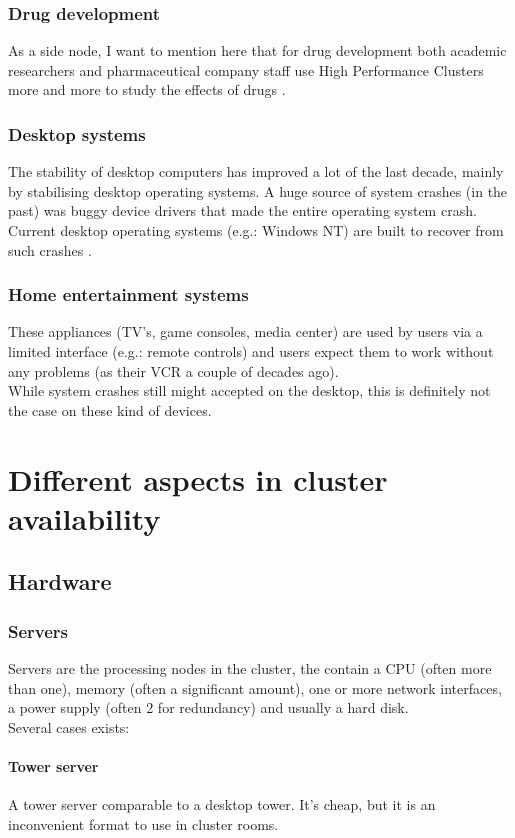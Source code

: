\documentclass[12pt]{report}
\begin{document}
\subsection{Drug development}
As a side node, I want to mention here that for drug development both
academic researchers and pharmaceutical company staff use High
Performance Clusters more and more to study the effects of drugs
\cite{deforche2007bayesian} \cite{lengauer2006bioinformatics}.

\subsection{Desktop systems}
The stability of desktop computers has improved a lot of the last decade,
mainly by stabilising desktop operating systems. A huge source of system
crashes (in the past) was buggy device drivers that made the entire
operating system crash.
Current desktop operating systems
(e.g.: Windows NT) are built to recover from such crashes
\cite{windows_nt_kernel}.

\subsection{Home entertainment systems}
These appliances (TV's, game consoles, media center) are used by users via a limited interface (e.g.:
remote controls) and users expect them to work without any problems
(as their VCR a  couple of decades ago).\\
While system crashes still might accepted on the desktop, this is
definitely not the case on these kind of devices. 


\chapter{Different aspects in cluster availability}
\label{chap:aspects}
\section{Hardware}
\subsection{Servers}
Servers are the processing nodes in the cluster, the contain a CPU
(often more than one), memory (often a significant amount), one or
more network interfaces, a power supply (often 2 for redundancy) and
usually a hard disk.\\
Several cases exists:
\subsubsection{Tower server} 
A tower server comparable to a desktop tower. It's cheap, but it is
  an inconvenient format to use in cluster rooms.
\end{document}
